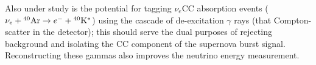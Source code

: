 Also under study is the potential for tagging $\nu_e$CC absorption
events ($\nu_e +{}^{40}{\rm Ar} \rightarrow e^- +{}^{40}{\rm K^*}$)
using the cascade of de-excitation $\gamma$ rays (that Compton-scatter
in the detector); this should serve the dual purposes of rejecting
background and isolating the CC component of the supernova burst
signal.  Reconstructing these gammas also improves the neutrino energy
measurement.





